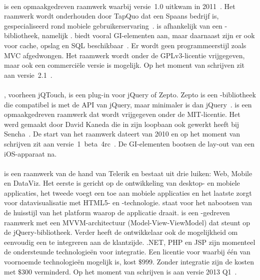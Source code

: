 \paragraph{\lungo} %
\lungo{} is een opmaakgedreven raamwerk waarbij versie~1.0 uitkwam in 2011~\cite{TapQuo2011}.
Het raamwerk wordt onderhouden door TapQuo dat een Spaans bedrijf is, gespecialiseerd rond mobiele gebruikerservaring~\cite{TapQuo2013a}.
\lungo{} is afhankelijk van een \js{}-bibliotheek, namelijk \quo{}.
\lungo{} biedt vooral GI-elementen aan, maar daarnaast zijn er ook  voor cache, opslag en SQL beschikbaar~\cite{TapQuo2013}.
Er wordt geen programmeerstijl zoals MVC afgedwongen.
Het raamwerk wordt onder de GPLv3-licentie vrijgegeven, maar ook een commerciële versie is mogelijk.
Op het moment van schrijven zit \lungo{} aan versie~2.1~\cite{TapQuo2013}.

\paragraph{\jqt}%
\jqt{}, voorheen jQTouch, is een plug-in voor jQuery of Zepto.
Zepto is een \js{}-bibliotheek die compatibel is met de API van jQuery, maar minimaler is dan jQuery~\cite{Zepto2013}.
\jqt{} is een opmaakgedreven raamwerk dat wordt vrijgegeven onder de MIT-licentie.
Het werd gemaakt door David Kaneda die in zijn loopbaan ook gewerkt heeft bij Sencha~\cite{JQT2013,Kaneda2013}.
De start van het raamwerk dateert van 2010 en op het moment van schrijven zit \jqt{} aan versie~1~beta~4rc~\cite{JQTouch2010,JQT2013}.
De GI-elementen bootsen de lay-out van een iOS-apparaat na.

\paragraph{\kendo} %
\kendo{} is een raamwerk van de hand van Telerik en bestaat uit drie luiken:  Web, Mobile en DataViz.
Het eerste is gericht op de ontwikkeling van desktop- en mobiele applicaties,  het tweede voegt een  toe aan mobiele applicaties en het laatste zorgt voor datavisualisatie met HTML5- en \js{}-technologie.
 staat voor het nabootsen van de huisstijl van het platform waarop de applicatie draait.
\kendo{} is een \js{}-gedreven raamwerk met een MVVM-architectuur (Model-View-ViewModel) dat steunt op de jQuery-bibliotheek.
Verder heeft de ontwikkelaar ook de mogelijkheid om eenvoudig een  te integreren aan de klantzijde.
.NET,  PHP en JSP zijn momenteel de ondersteunde technologieën voor  integratie.
Een licentie voor \kendo{} waarbij één van voornoemde technologieën mogelijk is, kost $\$999$.
Zonder  integratie zijn de kosten met $\$300$ verminderd.
Op het moment van schrijven is \kendo{} aan versie 2013 Q1~\cite{Telerike}.

